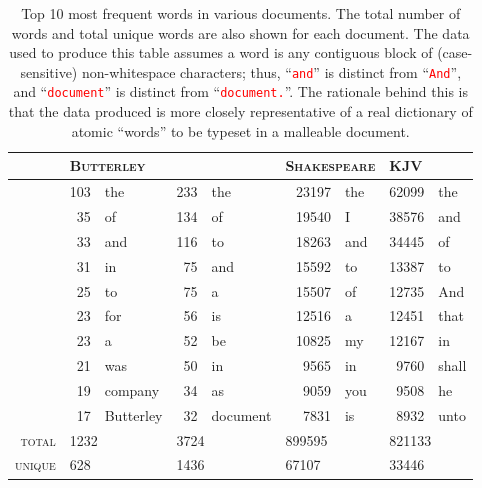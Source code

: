 \begin{table} \footnotesize
    \myfloatalign
  \begin{tabularx}{\textwidth}{rrlrlrlrl} \toprule
    & \multicolumn{2}{l}{\textsc{Butterley}} & \multicolumn{2}{l}{\cite{Pinkney2011}} & \multicolumn{2}{l}{\textsc{Shakespeare}} & \multicolumn{2}{l}{\textsc{KJV}}\\
    \midrule
    & 103 & the & 233 & the & 23197 & the & 62099 & the \\ 
    & 35 & of & 134 & of & 19540 & I & 38576 & and \\ 
    & 33 & and & 116 & to & 18263 & and & 34445 & of \\ 
    & 31 & in & 75 & and & 15592 & to & 13387 & to \\ 
    & 25 & to & 75 & a & 15507 & of & 12735 & And \\ 
    & 23 & for & 56 & is & 12516 & a & 12451 & that \\ 
    & 23 & a & 52 & be & 10825 & my & 12167 & in \\ 
    & 21 & was & 50 & in & 9565 & in & 9760 & shall \\ 
    & 19 & company & 34 & as & 9059 & you & 9508 & he \\ 
    & 17 & Butterley & 32 & document & 7831 & is & 8932 & unto \\ 
    \midrule
    \textsc{total} & \multicolumn{2}{l}{1232} & \multicolumn{2}{l}{3724} & \multicolumn{2}{l}{899595} & \multicolumn{2}{l}{821133} \\ 
    \midrule
    \textsc{unique} & \multicolumn{2}{l}{628} & \multicolumn{2}{l}{1436} & \multicolumn{2}{l}{67107} & \multicolumn{2}{l}{33446} \\ 
    \bottomrule
    
  \end{tabularx}
  \caption[Word frequencies in various documents]{Top 10 most frequent words in various documents. The total number of words and total unique words are also shown for each document. The data used to produce this table assumes a word is any contiguous block of (case-sensitive) non-whitespace characters; thus, ``\texttt{\textcolor{red}{and}}'' is distinct from ``\texttt{\textcolor{red}{And}}'', and ``\texttt{\textcolor{red}{document}}'' is distinct from ``\texttt{\textcolor{red}{document.}}''. The rationale behind this is that the data produced is more closely representative of a real dictionary of atomic ``words'' to be typeset in a malleable document.}
  \label{tab:wordfreq}
\end{table}

